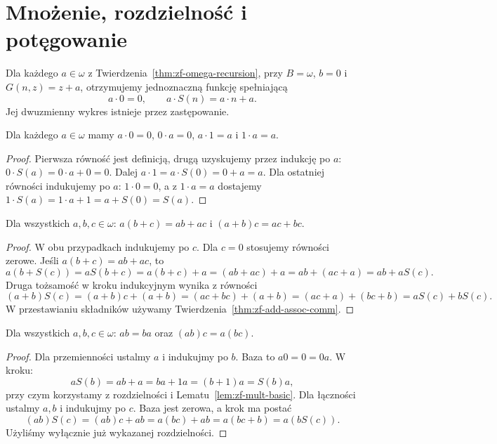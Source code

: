 \section{Mnożenie, rozdzielność i potęgowanie}

\begin{definicja}\label{def:zf-multiplication}
Dla każdego $a\in\omega$ z
Twierdzenia~\ref{thm:zf-omega-recursion},
przy $B=\omega$, $b=0$ i $G(n,z)=z+a$,
otrzymujemy jednoznaczną funkcję spełniającą
\begin{equation}\label{eq:zf-mult}
a\cdot0=0,\qquad a\cdot S(n)=a\cdot n+a.
\end{equation}
Jej dwuzmienny wykres istnieje przez zastępowanie.
\end{definicja}

\begin{lemat}
\label{lem:zf-mult-basic}
Dla każdego $a\in\omega$ mamy
$a\cdot0=0$, $0\cdot a=0$,
$a\cdot1=a$ i $1\cdot a=a$.
\end{lemat}
\begin{proof}
Pierwsza równość jest definicją,
drugą uzyskujemy przez indukcję po $a$:
$0\cdot S(a)=0\cdot a+0=0$.
Dalej
$a\cdot1=a\cdot S(0)=0+a=a$.
Dla ostatniej równości indukujemy po $a$:
$1\cdot0=0$, a z $1\cdot a=a$ dostajemy
$1\cdot S(a)=1\cdot a+1=a+S(0)=S(a)$.
\end{proof}

\begin{twierdzenie}
\label{thm:zf-distributivity}
Dla wszystkich $a,b,c\in\omega$:
$a(b+c)=ab+ac$ i $(a+b)c=ac+bc$.
\end{twierdzenie}
\begin{proof}
W obu przypadkach indukujemy po $c$.
Dla $c=0$ stosujemy równości zerowe.
Jeśli $a(b+c)=ab+ac$, to
\[
a(b+S(c))=aS(b+c)=a(b+c)+a
=(ab+ac)+a=ab+(ac+a)=ab+aS(c).
\]
Druga tożsamość w kroku indukcyjnym
wynika z równości
\[
(a+b)S(c)=(a+b)c+(a+b)
=(ac+bc)+(a+b)=(ac+a)+(bc+b)=aS(c)+bS(c).
\]
W przestawianiu składników używamy
Twierdzenia~\ref{thm:zf-add-assoc-comm}.
\end{proof}

\begin{twierdzenie}
\label{thm:zf-mult-assoc-comm}
Dla wszystkich $a,b,c\in\omega$:
$ab=ba$ oraz $(ab)c=a(bc)$.
\end{twierdzenie}
\begin{proof}
Dla przemienności ustalmy $a$ i indukujmy po $b$.
Baza to $a0=0=0a$. W kroku:
\[
aS(b)=ab+a=ba+1a=(b+1)a=S(b)a,
\]
przy czym korzystamy z rozdzielności
i Lematu~\ref{lem:zf-mult-basic}.
Dla łączności ustalmy $a,b$
i indukujmy po $c$. Baza jest zerowa,
a krok ma postać
\[
(ab)S(c)=(ab)c+ab=a(bc)+ab
=a(bc+b)=a(bS(c)).
\]
Użyliśmy wyłącznie już wykazanej rozdzielności.
\end{proof}

